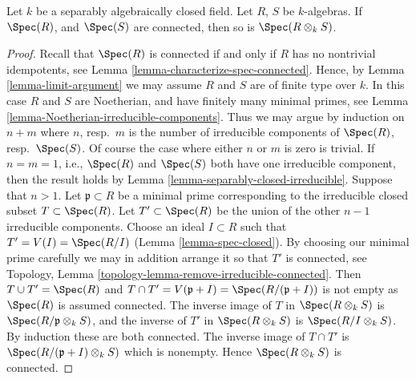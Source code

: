 \begin{lemma}
\label{lemma-separably-closed-connected}
Let $k$ be a separably algebraically closed field.
Let $R$, $S$ be $k$-algebras. If $\Spec(R)$, and
$\Spec(S)$ are connected, then so is
$\Spec(R \otimes_k S)$.
\end{lemma}

\begin{proof}
Recall that $\Spec(R)$ is connected if and only if
$R$ has no nontrivial idempotents, see
Lemma \ref{lemma-characterize-spec-connected}.
Hence, by Lemma \ref{lemma-limit-argument} we may assume $R$ and $S$ are of
finite type over $k$.
In this case $R$ and $S$ are Noetherian,
and have finitely many minimal primes, see
Lemma \ref{lemma-Noetherian-irreducible-components}.
Thus we may argue by induction on $n + m$ where $n$, resp.\ $m$
is the number of irreducible components of $\Spec(R)$,
resp.\ $\Spec(S)$. Of course the case where either $n$ or
$m$ is zero is trivial. If $n = m = 1$, i.e.,
$\Spec(R)$ and $\Spec(S)$ both have one irreducible component,
then the result holds by Lemma \ref{lemma-separably-closed-irreducible}.
Suppose that $n > 1$. Let $\mathfrak p \subset R$ be a minimal prime
corresponding to the irreducible closed subset $T \subset \Spec(R)$.
Let $T' \subset \Spec(R)$ be the union of the other $n - 1$
irreducible components. Choose an ideal $I \subset R$
such that $T' = V(I) = \Spec(R/I)$ (Lemma \ref{lemma-spec-closed}).
By choosing our minimal prime carefully
we may in addition arrange it so that $T'$ is connected, see
Topology, Lemma \ref{topology-lemma-remove-irreducible-connected}.
Then $T \cup T' = \Spec(R)$ and
$T \cap T' = V(\mathfrak p + I) = \Spec(R/(\mathfrak p + I))$
is not empty as $\Spec(R)$ is assumed connected.
The inverse image of $T$ in $\Spec(R \otimes_k S)$
is $\Spec(R/\mathfrak p \otimes_k S)$, and the inverse
of $T'$ in $\Spec(R \otimes_k S)$
is $\Spec(R/I \otimes_k S)$. By induction these are both
connected. The inverse image of $T \cap T'$ is
$\Spec(R/(\mathfrak p + I) \otimes_k S)$ which is nonempty.
Hence $\Spec(R \otimes_k S)$ is connected.
\end{proof}